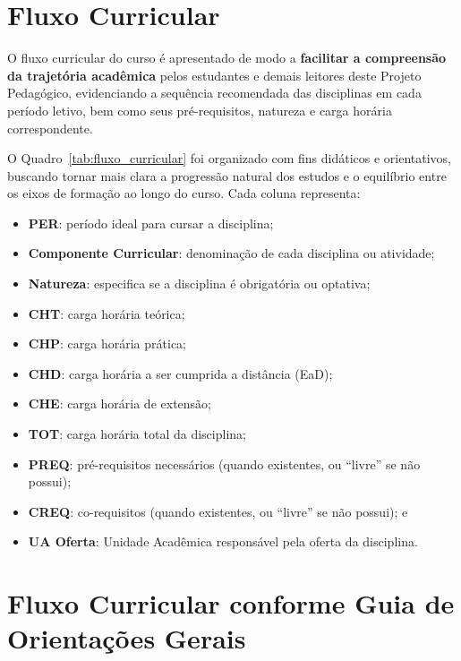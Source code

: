 \newpage

\section{Fluxo Curricular}

O fluxo curricular do curso é apresentado de modo a \textbf{facilitar a compreensão da trajetória acadêmica} pelos estudantes e demais leitores deste Projeto Pedagógico, evidenciando a sequência recomendada das disciplinas em cada período letivo, bem como seus pré-requisitos, natureza e carga horária correspondente.

O Quadro~\ref{tab:fluxo_curricular} foi organizado com fins didáticos e orientativos, buscando tornar mais clara a progressão natural dos estudos e o equilíbrio entre os eixos de formação ao longo do curso. Cada coluna representa:

\begin{itemize}[itemsep=0pt]
    \item \textbf{PER}: período ideal para cursar a disciplina;
    \item \textbf{Componente Curricular}: denominação de cada disciplina ou atividade;
    \item \textbf{Natureza}: especifica se a disciplina é obrigatória ou optativa;
    \item \textbf{CHT}: carga horária teórica;
    \item \textbf{CHP}: carga horária prática;
    \item \textbf{CHD}: carga horária a ser cumprida a distância (EaD);
    \item \textbf{CHE}: carga horária de extensão;
    \item \textbf{TOT}: carga horária total da disciplina;
    \item \textbf{PREQ}: pré-requisitos necessários (quando existentes, ou ``livre'' se não possui);
    \item \textbf{CREQ}: co-requisitos (quando existentes, ou ``livre'' se não possui); e
    \item \textbf{UA Oferta}: Unidade Acadêmica responsável pela oferta da disciplina.
\end{itemize}



\newpage

\section{Fluxo Curricular conforme Guia de Orientações Gerais}

